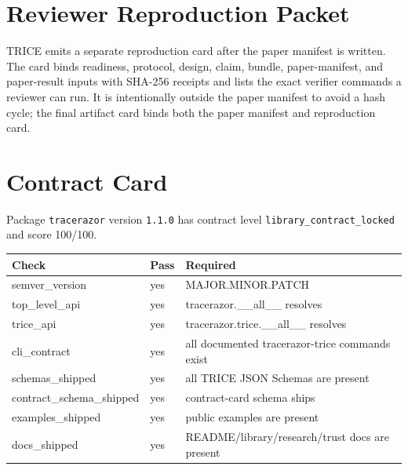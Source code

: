 \documentclass[10pt]{article}
\begin{document}
        \section{Reviewer Reproduction Packet}
TRICE emits a separate reproduction card after the paper manifest is written. The card binds readiness, protocol, design, claim, bundle, paper-manifest, and paper-result inputs with SHA-256 receipts and lists the exact verifier commands a reviewer can run. It is intentionally outside the paper manifest to avoid a hash cycle; the final artifact card binds both the paper manifest and reproduction card.


        \section{Contract Card}
Package \texttt{tracerazor} version \texttt{1.1.0} has contract level \texttt{library\_contract\_locked} and score 100/100.

\begin{tabular}{lll}
Check & Pass & Required \\
\hline
semver\_version & yes & MAJOR.MINOR.PATCH \\
top\_level\_api & yes & tracerazor.\_\_all\_\_ resolves \\
trice\_api & yes & tracerazor.trice.\_\_all\_\_ resolves \\
cli\_contract & yes & all documented tracerazor-trice commands exist \\
schemas\_shipped & yes & all TRICE JSON Schemas are present \\
contract\_schema\_shipped & yes & contract-card schema ships \\
examples\_shipped & yes & public examples are present \\
docs\_shipped & yes & README/library/research/trust docs are present \\
\end{tabular}
\end{document}
